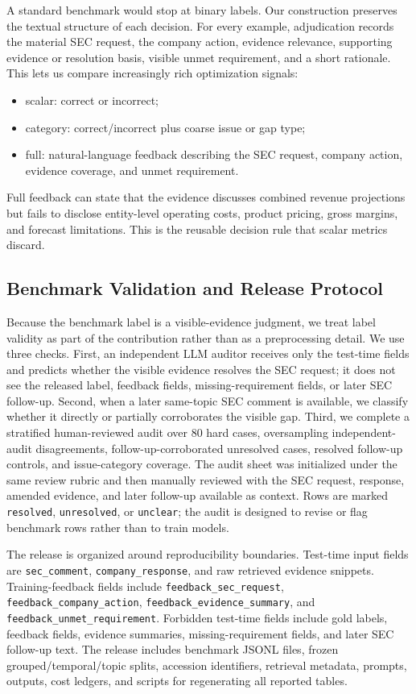 \documentclass[11pt]{article}
\begin{document}
A standard benchmark would stop at binary labels. Our construction preserves the textual structure of each decision. For every example, adjudication records the material SEC request, the company action, evidence relevance, supporting evidence or resolution basis, visible unmet requirement, and a short rationale. This lets us compare increasingly rich optimization signals:
\begin{itemize}[leftmargin=*]
    \item scalar: correct or incorrect;
    \item category: correct/incorrect plus coarse issue or gap type;
    \item full: natural-language feedback describing the SEC request, company action, evidence coverage, and unmet requirement.
\end{itemize}
Full feedback can state that the evidence discusses combined revenue projections but fails to disclose entity-level operating costs, product pricing, gross margins, and forecast limitations. This is the reusable decision rule that scalar metrics discard.

\subsection{Benchmark Validation and Release Protocol}

Because the benchmark label is a visible-evidence judgment, we treat label validity as part of the contribution rather than as a preprocessing detail. We use three checks. First, an independent LLM auditor receives only the test-time fields and predicts whether the visible evidence resolves the SEC request; it does not see the released label, feedback fields, missing-requirement fields, or later SEC follow-up. Second, when a later same-topic SEC comment is available, we classify whether it directly or partially corroborates the visible gap. Third, we complete a stratified human-reviewed audit over 80 hard cases, oversampling independent-audit disagreements, follow-up-corroborated unresolved cases, resolved follow-up controls, and issue-category coverage. The audit sheet was initialized under the same review rubric and then manually reviewed with the SEC request, response, amended evidence, and later follow-up available as context. Rows are marked \texttt{resolved}, \texttt{unresolved}, or \texttt{unclear}; the audit is designed to revise or flag benchmark rows rather than to train models.

The release is organized around reproducibility boundaries. Test-time input fields are \texttt{sec\_comment}, \texttt{company\_response}, and raw retrieved evidence snippets. Training-feedback fields include \texttt{feedback\_sec\_request}, \texttt{feedback\_company\_action}, \texttt{feedback\_evidence\_summary}, and \texttt{feedback\_unmet\_requirement}. Forbidden test-time fields include gold labels, feedback fields, evidence summaries, missing-requirement fields, and later SEC follow-up text. The release includes benchmark JSONL files, frozen grouped/temporal/topic splits, accession identifiers, retrieval metadata, prompts, outputs, cost ledgers, and scripts for regenerating all reported tables.
\end{document}
